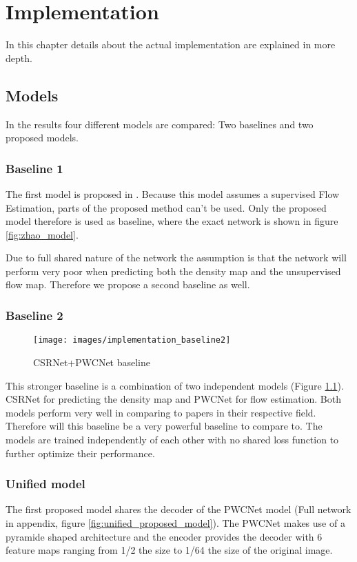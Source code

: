\chapter{Implementation}
In this chapter details about the actual implementation are explained in more depth.

\section{Models}
In the results four different models are compared: Two baselines and two proposed models.
\subsection{Baseline 1}
The first model is proposed in \cite{Zhang2016}. Because this model assumes a supervised Flow Estimation, parts of the proposed method can't be used. Only the proposed model therefore is used as baseline, where the exact network is shown in figure \ref{fig:zhao_model}.

Due to full shared nature of the network the assumption is that the network will perform very poor when predicting both the density map and the unsupervised flow map. Therefore we propose a second baseline as well.

\subsection{Baseline 2}

\begin{figure}[h]
\centering
\texttt{[image: images/implementation\_baseline2]}
\caption{CSRNet+PWCNet baseline}
\label{fig:baseline2_model}
\end{figure}

This stronger baseline is a combination of two independent models (Figure \ref{fig:baseline2_model}). CSRNet \cite{li2018csrnet} for predicting the density map and PWCNet \cite{sun_pwc-net_2018} for flow estimation. Both models perform very well in comparing to papers in their respective field. Therefore will this baseline be a very powerful baseline to compare to. The models are trained independently of each other with no shared loss function to further optimize their performance.


\subsection{Unified model}
The first proposed model shares the decoder of the PWCNet model (Full network in appendix, figure \ref{fig:unified_proposed_model}). The PWCNet makes use of a pyramide shaped architecture and the encoder provides the decoder with 6 feature maps ranging from 1/2 the size to 1/64 the size of the original image.

